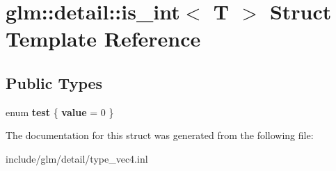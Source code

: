 \hypertarget{structglm_1_1detail_1_1is__int}{}\section{glm\+:\+:detail\+:\+:is\+\_\+int$<$ T $>$ Struct Template Reference}
\label{structglm_1_1detail_1_1is__int}
\subsection*{Public Types}
\begin{DoxyCompactItemize}
\item 
\mbox{\label{structglm_1_1detail_1_1is__int_a6a1d15bd1184bc07664114fa30199e01}} 
enum {\bfseries test} \{ {\bfseries value} = 0
 \}
\end{DoxyCompactItemize}


The documentation for this struct was generated from the following file\+:\begin{DoxyCompactItemize}
\item 
include/glm/detail/type\+\_\+vec4.\+inl\end{DoxyCompactItemize}
